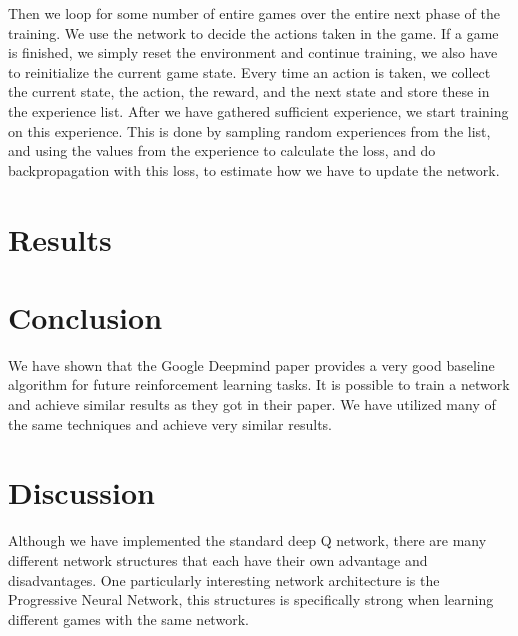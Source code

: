 \documentclass{article}
\begin{document}
Then we loop for some number of entire games over the entire next phase of the training. We use the network to decide the actions taken in the game. If a game is finished, we simply reset the environment and continue training, we also have to reinitialize the current game state. Every time an action is taken, we collect the current state, the action, the reward, and the next state and store these in the experience list. After we have gathered sufficient experience, we start training on this experience. This is done by sampling random experiences from the list, and using the values from the experience to calculate the loss, and do backpropagation with this loss, to estimate how we have to update the network. 





%




\section{Results}


\section{Conclusion}

We have shown that the Google Deepmind paper provides a very good baseline algorithm for future reinforcement learning tasks. It is possible to train a network and achieve similar results as they got in their paper.
We have utilized many of the same techniques and achieve very similar results.

\section{Discussion}
Although we have implemented the standard deep Q network, there are many different network structures that each have their own advantage and disadvantages. One particularly interesting network architecture is the Progressive Neural Network, this structures is specifically strong when learning different games with the same network.
\end{document}

